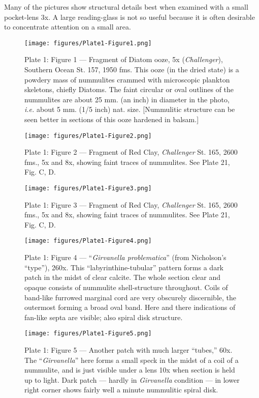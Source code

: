 \documentclass[a4paper, 12pt, oneside]{article}
\begin{document}
Many of the pictures show structural details best when examined with a small pocket-lens 3x. A large reading-glass is not so useful because it is often desirable to concentrate attention on a small area.
\clearpage
\pagestyle{fancy}
\fancyhf{}
\cfoot{\thepage}
\begin{figure}[b]
\centering
\texttt{[image: figures/Plate1-Figure1.png]}
\caption{\small Plate 1: Figure 1 --- Fragment of Diatom ooze, 5x (\emph{Challenger}), Southern Ocean St. 157, 1950 fms. This ooze (in the dried state) is a powdery mass of nummulites crammed with microscopic plankton skeletons, chiefly Diatoms. The faint circular or oval outlines of the nummulites are about 25 mm. (an inch) in diameter in the photo, \emph{i.e.} about 5 mm. (1/5 inch) nat. size. [Nummulitic structure can be seen better in sections of this ooze hardened in balsam.]}
\end{figure}
\clearpage
\begin{figure}[b]
\centering
\texttt{[image: figures/Plate1-Figure2.png]}
\caption{\small Plate 1: Figure 2 --- Fragment of Red Clay, \emph{Challenger} St. 165, 2600 fms., 5x and 8x, showing faint traces of nummulites. See Plate 21, Fig. C, D.}
\end{figure}
\clearpage
\begin{figure}[b]
\centering
\texttt{[image: figures/Plate1-Figure3.png]}
\caption{\small Plate 1: Figure 3 --- Fragment of Red Clay, \emph{Challenger} St. 165, 2600 fms., 5x and 8x, showing faint traces of nummulites. See Plate 21, Fig. C, D.}
\end{figure}
\clearpage
\begin{figure}[b]
\centering
\texttt{[image: figures/Plate1-Figure4.png]}
\caption{\small Plate 1: Figure 4 --- ``\emph{Girvanella problematica}'' (from Nicholson's ``type''), 260x. This ``labyrinthine-tubular'' pattern forms a dark patch in the midst of clear calcite. The whole section clear and opaque consists of nummulite shell-structure throughout. Coils of band-like furrowed marginal cord are very obscurely discernible, the outermost forming a broad oval band. Here and there indications of fan-like septa are visible; also spiral disk structure.}
\end{figure}
\clearpage
\begin{figure}[b]
\centering
\texttt{[image: figures/Plate1-Figure5.png]}
\caption{\small Plate 1: Figure 5 --- Another patch with much larger ``tubes,'' 60x. The ``\emph{Girvanella}'' here forms a small speck in the midst of a coil of a nummulite, and is just visible under a lens 10x when section is held up to light. Dark patch --- hardly in \emph{Girvanella} condition --- in lower right corner shows fairly well a minute nummulitic spiral disk.}
\end{figure}
\end{document}
